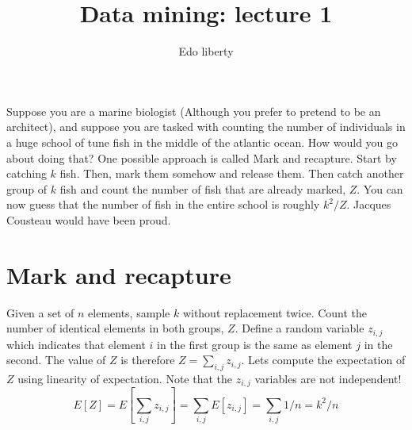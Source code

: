 \documentclass{article}
\title{Data mining: lecture 1} %
\author{Edo liberty}
\date{\nonumber}
\begin{document}
\maketitle


Suppose you are a marine biologist (Although you prefer to pretend to be an architect), and
suppose you are tasked with counting the number of individuals in a huge school of tune fish in 
the middle of the atlantic ocean. How would you go about doing that? 
One possible approach is called Mark and recapture.
Start by catching $k$ fish. Then, mark them somehow 
and release them. Then catch another group of $k$ fish and count the number of fish that are already marked, $Z$.
You can now guess that the number of fish in the entire school is roughly $k^2/Z$.
Jacques Cousteau would have been proud.

\section*{Mark and recapture}
Given a set of $n$ elements, sample $k$ without replacement twice.
Count the number of identical elements in both groups, $Z$.
Define a random variable $z_{i,j}$ which indicates that
element $i$ in the first group is the same as element $j$ in the second.
The value of $Z$ is therefore $Z = \sum_{i,j} z_{i,j}$.
Lets compute the expectation of $Z$ using linearity of expectation.
Note that the $z_{i,j}$ variables are not independent!
\begin{equation}
E[Z] = E[\sum_{i,j} z_{i,j}] = \sum_{i,j} E [z_{i,j}] = \sum_{i,j} 1/n = k^2/n
\end{equation}


%
\end{document}
